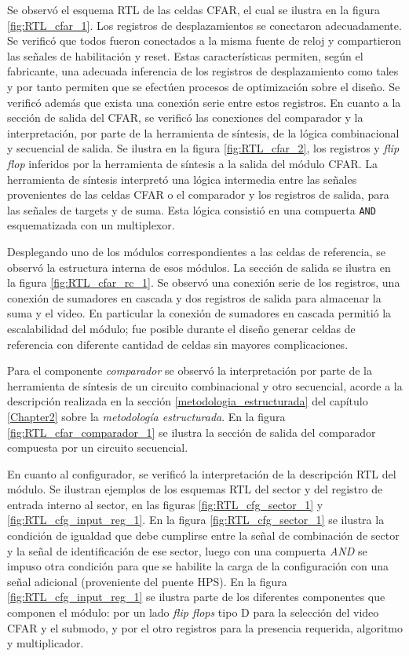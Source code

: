 Se observó el esquema RTL de las celdas CFAR, el cual se ilustra en la figura \ref{fig:RTL_cfar_1}. Los registros de desplazamientos se conectaron adecuadamente. Se verificó que todos fueron conectados a la misma fuente de reloj y compartieron las señales de habilitación y reset. Estas características permiten, según el fabricante, una adecuada inferencia de los registros de desplazamiento como tales y por tanto permiten que se efectúen procesos de optimización sobre el diseño. Se verificó además que exista una conexión serie entre estos registros. En cuanto a la sección de salida del CFAR, se verificó las conexiones del comparador y la interpretación, por parte de la herramienta de síntesis, de la lógica combinacional y secuencial de salida. Se ilustra en la figura \ref{fig:RTL_cfar_2}, los registros y \textit{flip flop} inferidos por la herramienta de síntesis a la salida del módulo CFAR. La herramienta de síntesis interpretó una lógica intermedia entre las señales provenientes de las celdas CFAR o el comparador y los registros de salida, para las señales de targets y de suma. Esta lógica consistió en una compuerta \texttt{AND} esquematizada con un multiplexor.

Desplegando uno de los módulos correspondientes a las celdas de referencia, se observó la estructura interna de esos módulos. La sección de salida se ilustra en la figura \ref{fig:RTL_cfar_rc_1}. Se observó una conexión serie de los registros, una conexión de sumadores en cascada y dos registros de salida para almacenar la suma y el video. En particular la conexión de sumadores en cascada permitió la escalabilidad del módulo; fue posible durante el diseño generar celdas de referencia con diferente cantidad de celdas sin mayores complicaciones.

Para el componente \textit{comparador} se observó la interpretación por parte de la herramienta de síntesis de un circuito combinacional y otro secuencial, acorde a la descripción realizada en la sección \ref{metodologia_estructurada} del capítulo \ref{Chapter2} sobre la \textit{metodología estructurada}. En la figura \ref{fig:RTL_cfar_comparador_1} se ilustra la sección de salida del comparador compuesta por un circuito secuencial.

En cuanto al configurador, se verificó la interpretación de la descripción RTL del módulo. Se ilustran ejemplos de los esquemas RTL del sector y del registro de entrada interno al sector, en las figuras \ref{fig:RTL_cfg_sector_1} y \ref{fig:RTL_cfg_input_reg_1}. En la figura \ref{fig:RTL_cfg_sector_1} se ilustra la condición de igualdad que debe cumplirse entre la señal de combinación de sector y la señal de identificación de ese sector, luego con una compuerta \textit{AND} se impuso otra condición para que se habilite la carga de la configuración con una señal adicional (proveniente del puente HPS). En la figura \ref{fig:RTL_cfg_input_reg_1} se ilustra parte de los diferentes componentes que componen el módulo: por un lado \textit{flip flops} tipo D para la selección del video CFAR y el submodo, y por el otro registros para la presencia requerida, algoritmo y multiplicador.
